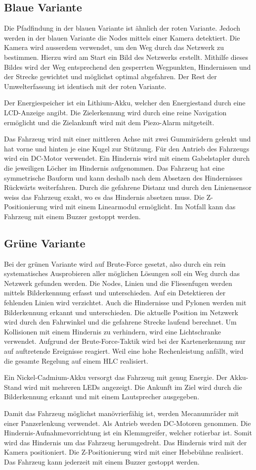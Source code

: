 \documentclass[main.tex]{subfiles} %
\begin{document}
\subsection{Blaue Variante}
Die Pfadfindung in der blauen Variante ist ähnlich der roten Variante. Jedoch
werden in der blauen Variante die Nodes mittels einer Kamera detektiert. Die
Kamera wird ausserdem verwendet, um den Weg durch das Netzwerk zu bestimmen.
Hierzu wird am Start ein Bild des Netzwerks erstellt. Mithilfe dieses Bildes
wird der Weg entsprechend den gesperrten Wegpunkten, Hindernissen und der
Strecke gewichtet und möglichst optimal abgefahren. Der Rest der
Umwelterfassung ist identisch mit der roten Variante.

Der Energiespeicher ist ein Lithium-Akku, welcher den Energiestand durch eine
LCD-Anzeige angibt. Die Zielerkennung wird durch eine reine Navigation
ermöglicht und die Zielankunft wird mit dem Piezo-Alarm mitgeteilt.

Das Fahrzeug wird mit einer mittleren Achse mit zwei Gummirädern gelenkt und
hat vorne und hinten je eine Kugel zur Stützung. Für den Antrieb des Fahrzeugs
wird ein DC-Motor verwendet. Ein Hindernis wird mit einem Gabelstapler durch
die jeweiligen Löcher im Hindernis aufgenommen. Das Fahrzeug hat eine
symmetrische Bauform und kann deshalb nach dem Absetzen des Hindernisses
Rückwärts weiterfahren. Durch die gefahrene Distanz und durch den Liniensensor
weiss das Fahrzeug exakt, wo es das Hindernis absetzen muss. Die
Z-Positionierung wird mit einem Linearmodul ermöglicht. Im Notfall kann das
Fahrzeug mit einem Buzzer gestoppt werden.

\subsection{Grüne Variante}
Bei der grünen Variante wird auf Brute-Force gesetzt, also durch ein rein
systematisches Ausprobieren aller möglichen Lösungen soll ein Weg durch das
Netzwerk gefunden werden. Die Nodes, Linien und die Fliesenfugen werden mittels
Bilderkennung erfasst und unterschieden. Auf ein Detektieren der fehlenden
Linien wird verzichtet. Auch die Hindernisse und Pylonen werden mit
Bilderkennung erkannt und unterschieden. Die aktuelle Position im Netzwerk wird
durch den Fahrwinkel und die gefahrene Strecke laufend berechnet. Um
Kollisionen mit einem Hindernis zu verhindern, wird eine Lichtschranke
verwendet. Aufgrund der Brute-Force-Taktik wird bei der Kartenerkennung nur auf
auftretende Ereignisse reagiert. Weil eine hohe Rechenleistung anfällt, wird
die gesamte Regelung auf einem HLC realisiert.

Ein Nickel-Cadmium-Akku versorgt das Fahrzeug mit genug Energie. Der Akku-Stand
wird mit mehreren LEDs angezeigt. Die Ankunft im Ziel wird durch die
Bilderkennung erkannt und mit einem Lautsprecher ausgegeben.

Damit das Fahrzeug möglichst manövrierfähig ist, werden Mecanumräder mit einer
Panzerlenkung verwendet. Als Antrieb werden DC-Motoren genommen. Die
Hindernis-Aufnahmevorrichtung ist ein Klemmgreifer, welcher rotierbar ist.
Somit wird das Hindernis um das Fahrzeug herumgedreht. Das Hindernis wird mit
der Kamera positioniert. Die Z-Positionierung wird mit einer Hebebühne
realisiert. Das Fahrzeug kann jederzeit mit einem Buzzer gestoppt werden.
\end{document}
